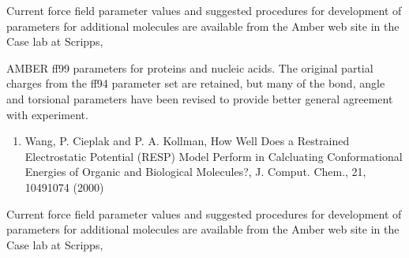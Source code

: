 \documentclass[letterpaper,11pt,english]{sphinxmanual}
\begin{document}
Current force field parameter values and suggested procedures for development of parameters for additional molecules are available from the Amber web site in the Case lab at Scripps, 


AMBER ff99 parameters for proteins and nucleic acids. The original partial charges from the ff94 parameter set are retained, but many of the bond, angle and torsional parameters have been revised to provide better general agreement with experiment.
\begin{enumerate}
%
\setcounter{enumi}{9}
\item {} 
Wang, P. Cieplak and P. A. Kollman, How Well Does a Restrained Electrostatic Potential (RESP) Model Perform in Calcluating Conformational Energies of Organic and Biological Molecules?, J. Comput. Chem., 21, 1049\sphinxhyphen{}1074 (2000)

\end{enumerate}

Current force field parameter values and suggested procedures for development of parameters for additional molecules are available from the Amber web site in the Case lab at Scripps, 

\end{document}
